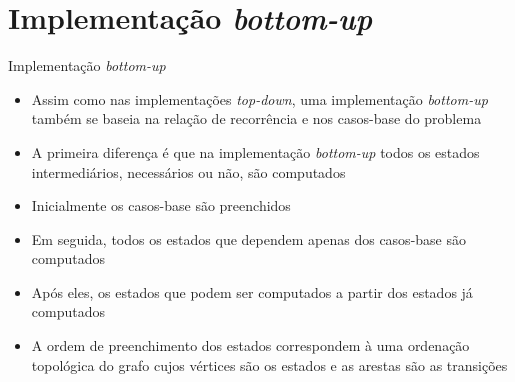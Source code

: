 \section{Implementação {\it bottom-up}}

\begin{frame}[fragile]{Implementação {\it bottom-up}}

    \begin{itemize}
        \item Assim como nas implementações \textit{top-down}, uma implementação \textit{bottom-up}
            também se baseia na relação de recorrência e nos casos-base do problema
        \pause

        \item A primeira diferença é que na implementação \textit{bottom-up} todos os estados
            intermediários, necessários ou não, são computados
        \pause

        \item Inicialmente os casos-base são preenchidos
        \pause

        \item Em seguida, todos os estados que dependem apenas dos casos-base são computados
        \pause

        \item Após eles, os estados que podem ser computados a partir dos estados já computados
        \pause

        \item A ordem de preenchimento dos estados correspondem à uma ordenação topológica do
            grafo cujos vértices são os estados e as arestas são as transições
    \end{itemize}

\end{frame}

